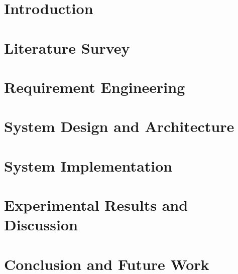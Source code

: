 \documentclass[a4paper, 11pt, oneside]{report}
\begin{document}
    \setcounter{page}{1}

	\chapter{Introduction}
	
    
    \chapter{Literature Survey}
    
    
    \chapter{Requirement Engineering}
    
    
    \chapter{System Design and Architecture}
    
    
    \chapter{System Implementation}
    
    
    \chapter{Experimental Results and Discussion}
    
    
    \chapter{Conclusion and Future Work}
    
    
    \newpage
    
	
        
\end{document}
